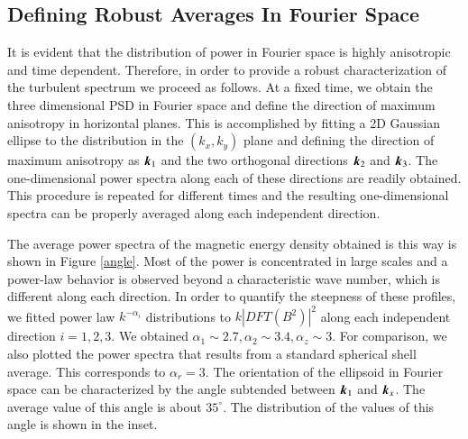 \documentclass[]{emulateapj}
\newcommand\bb[1]{\mbox{\boldmath{$#1$}}}
\begin{document}
\subsection{Defining Robust Averages In Fourier Space}
\label{robust}

It is evident that the distribution of power in Fourier space is highly anisotropic
and time dependent. Therefore, in order to provide a robust characterization of the turbulent
spectrum we proceed as follows. At a fixed time, we obtain the three dimensional 
PSD in Fourier space and define the direction of maximum anisotropy in horizontal 
planes. This is accomplished by fitting a 2D Gaussian ellipse to the distribution in 
the $(k_x,k_y)$ plane and defining the direction of maximum anisotropy
as $\bb{k}_1$ and the two orthogonal directions $\bb{k}_2$ and $\bb{k}_3$.
The one-dimensional power spectra along each of these directions are readily obtained.
This procedure is repeated for different times and the resulting one-dimensional spectra
can be properly averaged along each independent direction. 

The average power spectra of the magnetic energy density obtained is this way is 
shown in Figure \ref{angle}.
Most of the power is concentrated in large scales and a power-law behavior
is observed beyond a characteristic wave number, which is different along
each direction.  In order to quantify the steepness of these profiles, we fitted  
power law  $k^{-\alpha_{i}}$ distributions to  $k|DFT(B^2)|^2$ along each 
independent direction $i=1,2,3$.
We obtained $\alpha_1 \sim 2.7, \alpha_2 \sim 3.4,  \alpha_z \sim 3$.
For comparison, we also plotted the power spectra that results from a standard
spherical shell average. This corresponds to $\alpha_r = 3$.
The orientation of the ellipsoid in Fourier space can be characterized by the angle
subtended between $\bb{k}_1$ and $\bb{k}_x$.  The average value of this angle 
is about $35^\circ$. The distribution of the values of this angle is shown in the inset.
\end{document}
